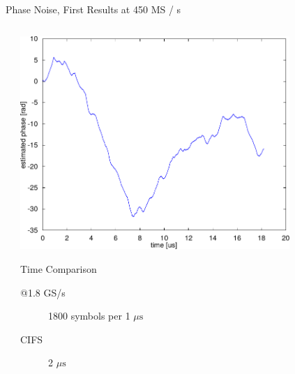 \documentclass{beamer}
\begin{document}
\begin{frame}{Phase Noise, First Results at 450 MS / s}
\begin{columns}[T]
\begin{column}{.5\textwidth}
    \end{column}
    \begin{column}{.5\textwidth}
      \centering
      \includegraphics[width=0.8\textwidth]{figures/matlab/res_450_qam4_phase_est}
      \begin{block}{Time Comparison}
        \begin{description}
        \item[@1.8 GS/s] 1800 symbols per 1 $\mu \text{s}$
        \item[CIFS] 2 $\mu \text{s}$
        \end{description}
      \end{block}
    \end{column}
  \end{columns}
\end{frame}
\end{document}
